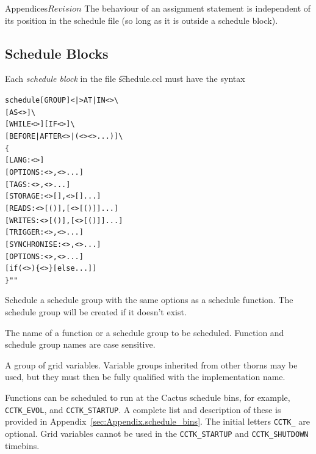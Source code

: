\begin{cactuspart}{Appendices}{}{$Revision$}
The behaviour of an assignment statement is independent of its
position in the schedule file (so long as it is outside a schedule
block). 

\subsection{Schedule Blocks}

Each \textit{schedule block} in the file {\t schedule.ccl} must have the syntax

\begin{alltt}
schedule [GROUP] <|> AT|IN <> \verb|\|
     [AS <>] \verb|\|
     [WHILE <>] [IF <>] \verb|\|
     [BEFORE|AFTER <>|(<> <> ...)] \verb|\|
\{
  [LANG: <>]
  [OPTIONS:       <>,<>...]
  [TAGS:          <>,<>...]
  [STORAGE:       <>[],<>[]...]
  [READS:         <>[()],[<>[()]]...]
  [WRITES:        <>[()],[<>[()]]...]
  [TRIGGER:       <>,<>...]
  [SYNCHRONISE:   <>,<>...]
  [OPTIONS:       <>,<>...]
  [if (<>) \{ <> \} [else ...]]
\} ""
\end{alltt}

\begin{Lentry}
  \item[{\tt GROUP}] Schedule a schedule group with the same options
  as a schedule function.  The schedule group will be created if it doesn't exist.

  \item[{\tt <\var{function name}|\var{group name}>}] The name of a function or a
  schedule group to be scheduled.  Function and schedule group names
  are case sensitive.

  \item[{\tt <\var{group}>}] A group of grid variables. Variable groups
  inherited from other thorns may be used, but they must then be fully
  qualified with the implementation name.

  \item[{\tt AT}] Functions can be scheduled to run at the Cactus
  schedule bins, for example, {\tt CCTK\_EVOL}, and {\tt CCTK\_STARTUP}. A
  complete list and description of these is provided in
  Appendix~\ref{sec:Appendix.schedule_bins}.  The initial letters
  {\tt CCTK\_} are optional. Grid variables cannot be used in the
  {\tt CCTK\_STARTUP} and {\tt CCTK\_SHUTDOWN} timebins.


\end{Lentry}
\end{cactuspart}
